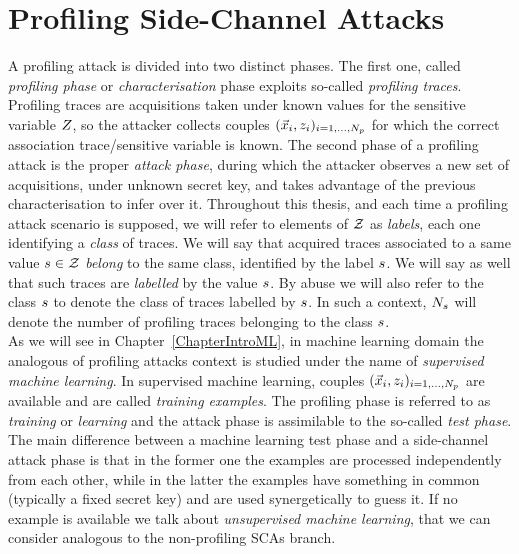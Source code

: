 \section{Profiling Side-Channel Attacks}\label{sec:profilingSCA}
A profiling attack is divided into two distinct phases. The first one, called \emph{profiling phase} or \emph{characterisation} phase exploits so-called \emph{profiling traces}. Profiling traces are acquisitions taken under known values for the sensitive variable $Z$, so the attacker collects couples $(\vec{x}_i, z_i)_{i=1, \dots , N_p}$ for which the correct association trace/sensitive variable is known. The second phase of a profiling attack is the proper \emph{attack phase}, during which the attacker observes a new set of acquisitions, under unknown secret key, and takes advantage of the previous characterisation to infer over it. Throughout this thesis, and each time a profiling attack scenario is supposed,  we will refer to elements of $\mathcal{Z}$ as \emph{labels}, each one identifying a \emph{class} of traces. We will say that acquired traces associated to a same value $s\in\mathcal{Z}$ \emph{belong} to the same class, identified by the label $s$. We will say as well that such traces are  \emph{labelled} by the value $s$. By abuse we will also refer to the class $s$ to denote the class of traces labelled by $s$. In such a context, $N_{s}$ will denote the number of profiling traces belonging to the class $s$.\\



As we will see in Chapter~\ref{ChapterIntroML}, in machine learning domain the analogous of profiling attacks context is studied under the name of \emph{supervised machine learning}. In supervised machine learning, couples $(\vec{x}_i, z_i)_{i=1, \dots , N_p}$ are available and are called \emph{training examples}. The profiling phase is referred to as \emph{training} or \emph{learning} and the attack phase is assimilable to the so-called \emph{test phase}. The main difference between a machine learning test phase and a side-channel attack phase is that in the former one the examples are processed independently from each other, while in the latter the examples have something in common (typically a fixed secret key) and are used synergetically to guess it. If no example is available we talk about \emph{unsupervised machine learning}, that we can consider analogous to the non-profiling SCAs branch. \\

